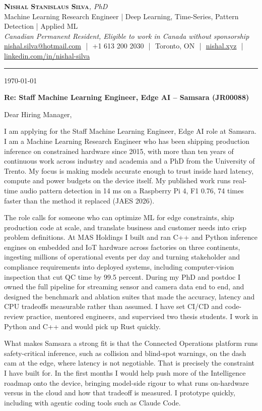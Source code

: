 \documentclass[11pt]{article}
\makeatletter
\newcommand{\clName}{Nishal Stanislaus Silva}
\newcommand{\clEmail}{nishal.silva@hotmail.com}
\newcommand{\clPhone}{+1 613 200 2030}
\newcommand{\clCity}{Toronto, ON}
\newcommand{\clSite}{https://nishal.xyz}
\newcommand{\clLinkedIn}{https://www.linkedin.com/in/nishal-silva}
\newcommand{\clStatus}{Canadian Permanent Resident, Eligible to work in Canada without sponsorship}
\newcommand{\clTagline}{Machine Learning Research Engineer | Deep Learning, Time-Series, Pattern Detection | Applied ML}
\newcommand{\clRole}{Staff Machine Learning Engineer, Edge AI}
\newcommand{\clCompany}{Samsara}
\newcommand{\clAddressee}{Dear Hiring Manager,}
\makeatother
\begin{document}
\pagestyle{empty}

\begin{center}
    {\LARGE \scshape \textbf{\clName}}{\large \textit{, PhD}}
    \\[1pt]
    {\small \clTagline}
    \\[1pt]
    {\footnotesize\textit{\clStatus}}
    \\[1pt]
    {\small
    \href{mailto:\clEmail}{\clEmail}
    \,\,|\,\, \clPhone
    \,\,|\,\, \clCity
    \,\,|\,\, \href{\clSite}{nishal.xyz}
    \,\,|\,\, \href{\clLinkedIn}{linkedin.com/in/nishal-silva}}
\end{center}

\rule{\linewidth}{0.4pt}\vspace{0.6em}

\today

\textbf{Re: \clRole{} -- \clCompany{} (JR00088)}

\clAddressee

I am applying for the Staff Machine Learning Engineer, Edge AI role at Samsara. I am a Machine Learning Research Engineer who has been shipping production inference on constrained hardware since 2015, with more than ten years of continuous work across industry and academia and a PhD from the University of Trento. My focus is making models accurate enough to trust inside hard latency, compute and power budgets on the device itself. My published work runs real-time audio pattern detection in 14 ms on a Raspberry Pi 4, F1 0.76, 74 times faster than the method it replaced (JAES 2026).

The role calls for someone who can optimize ML for edge constraints, ship production code at scale, and translate business and customer needs into crisp problem definitions. At MAS Holdings I built and ran C++ and Python inference engines on embedded and IoT hardware across factories on three continents, ingesting millions of operational events per day and turning stakeholder and compliance requirements into deployed systems, including computer-vision inspection that cut QC time by 99.5 percent. During my PhD and postdoc I owned the full pipeline for streaming sensor and camera data end to end, and designed the benchmark and ablation suites that made the accuracy, latency and CPU tradeoffs measurable rather than assumed. I have set CI/CD and code-review practice, mentored engineers, and supervised two thesis students. I work in Python and C++ and would pick up Rust quickly.

What makes Samsara a strong fit is that the Connected Operations platform runs safety-critical inference, such as collision and blind-spot warnings, on the dash cam at the edge, where latency is not negotiable. That is precisely the constraint I have built for. In the first months I would help push more of the Intelligence roadmap onto the device, bringing model-side rigour to what runs on-hardware versus in the cloud and how that tradeoff is measured. I prototype quickly, including with agentic coding tools such as Claude Code.
\end{document}
